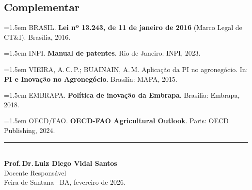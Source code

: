 \documentclass[11pt,a4paper]{article}
\begin{document}
\subsection*{Complementar}

\begin{small}
\hangindent=1.5em
BRASIL. \textbf{Lei nº 13.243, de 11 de janeiro de 2016} (Marco Legal de CT\&I). Brasília, 2016.\par\medskip

\hangindent=1.5em
INPI. \textbf{Manual de patentes}. Rio de Janeiro: INPI, 2023.\par\medskip

\hangindent=1.5em
VIEIRA, A.\,C.\,P.; BUAINAIN, A.\,M. Aplicação da PI no agronegócio. In: \textbf{PI e Inovação no Agronegócio}. Brasília: MAPA, 2015.\par\medskip

\hangindent=1.5em
EMBRAPA. \textbf{Política de inovação da Embrapa}. Brasília: Embrapa, 2018.\par\medskip

\hangindent=1.5em
OECD/FAO. \textbf{OECD-FAO Agricultural Outlook}. Paris: OECD Publishing, 2024.\par\medskip
\end{small}



\vfill

\begin{center}
\noindent\rule{6cm}{0.4pt}\\[6pt]
\textbf{Prof.\,Dr.\,Luiz Diego Vidal Santos}\\
Docente Responsável\\[4pt]
{\small Feira de Santana\,--\,BA, fevereiro de 2026.}
\end{center}
\end{document}

